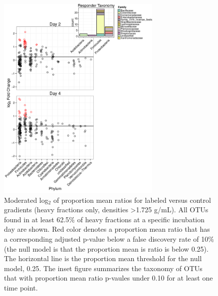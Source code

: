 \begin{figure}[h!]
  \centering
    \includegraphics[width=0.7\textwidth]{figures/l2fc1/l2fc_stacked_w_inset.png}
  \caption{Moderated log$_{2}$ of proportion mean ratios for labeled versus control gradients (heavy fractions only, densities >1.725 g/mL). All OTUs found in at least 62.5\% of heavy fractions at a specific incubation day are shown. Red color denotes a proportion mean ratio that has a corresponding adjusted p-value below a false discovery rate of 10\% (the null model is that the proportion mean is ratio is below 0.25). The horizontal line is the proportion mean threshold for the null model, 0.25. The inset figure summarizes the taxonomy of OTUs that with proportion mean ratio p-vaules under 0.10 for at least one time point.}
  \label{fig:l2fc}
\end{figure}

